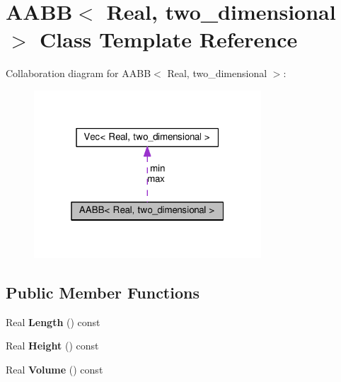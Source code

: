 \hypertarget{classAABB_3_01Real_00_01two__dimensional_01_4}{}\section{A\+A\+B\+B$<$ Real, two\+\_\+dimensional $>$ Class Template Reference}
\label{classAABB_3_01Real_00_01two__dimensional_01_4}


Collaboration diagram for A\+A\+B\+B$<$ Real, two\+\_\+dimensional $>$\+:\nopagebreak
\begin{figure}[H]
\begin{center}
\leavevmode
\includegraphics[width=241pt]{classAABB_3_01Real_00_01two__dimensional_01_4__coll__graph}
\end{center}
\end{figure}
\subsection*{Public Member Functions}
\begin{DoxyCompactItemize}
\item 
\hypertarget{classAABB_3_01Real_00_01two__dimensional_01_4_a65a6648938ef13ecf6cd5fcbe14870db}{}Real {\bfseries Length} () const \label{classAABB_3_01Real_00_01two__dimensional_01_4_a65a6648938ef13ecf6cd5fcbe14870db}

\item 
\hypertarget{classAABB_3_01Real_00_01two__dimensional_01_4_a4a6aeef68085a0add92352726069a99d}{}Real {\bfseries Height} () const \label{classAABB_3_01Real_00_01two__dimensional_01_4_a4a6aeef68085a0add92352726069a99d}

\item 
\hypertarget{classAABB_3_01Real_00_01two__dimensional_01_4_abeeebf41b3ac413f825148fe28a03669}{}Real {\bfseries Volume} () const \label{classAABB_3_01Real_00_01two__dimensional_01_4_abeeebf41b3ac413f825148fe28a03669}

\end{DoxyCompactItemize}
